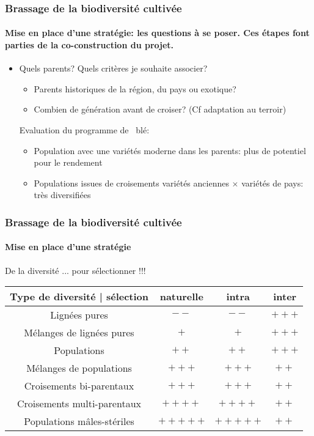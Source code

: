 \begin{frame}
\frametitle{Brassage de la biodiversité cultivée}
\framesubtitle{Mise en place d'une stratégie: les questions à se poser. Ces étapes font parties de la co-construction du projet.}


\begin{itemize}

\item Quels parents? Quels critères je souhaite associer?

\begin{itemize}
\item Parents historiques de la région, du pays ou exotique?
\item Combien de génération avant de croiser? (Cf adaptation au terroir)
\end{itemize}

Evaluation du programme de \SP~blé:

\begin{itemize}
\item Population avec une variétés moderne dans les parents: plus de potentiel pour le rendement
\item Populations issues de croisements variétés anciennes $\times$ variétés de pays: très diversifiées
\end{itemize}

\end{itemize}



\end{frame}



\begin{frame}
\frametitle{Brassage de la biodiversité cultivée}
\framesubtitle{Mise en place d'une stratégie}

\begin{block}{}
\centering\Large
De la diversité ... pour sélectionner !!!
\end{block}

\begin{center}
\begin{tabular}{cccc}
\hline
Type de diversité | sélection & naturelle & intra & inter \\
\hline
Lignées pures & $--$ & $--$ & $+++$ \\
\hline
Mélanges de lignées pures & $+$ & $+$ & $+++$ \\
\hline
Populations & $++$ & $++$ & $+++$ \\
\hline
Mélanges de populations & $+++$ & $+++$ & $++$ \\
\hline
Croisements bi-parentaux & $+++$ & $+++$ & $++$ \\
\hline
Croisements multi-parentaux & $++++$ & $++++$ & $++$ \\
\hline
Populations mâles-stériles & $+++++$ & $+++++$ & $++$ \\
\hline
\end{tabular}
\end{center}


\end{frame}




